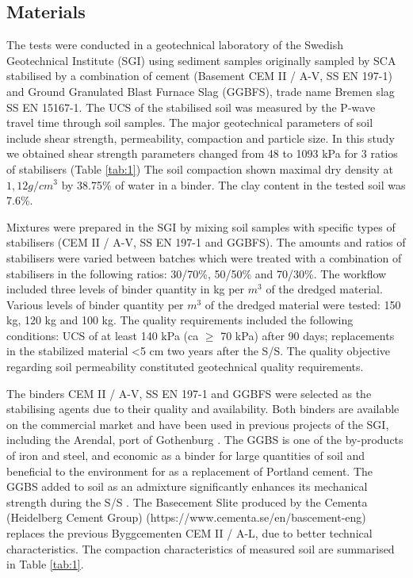 \documentclass[10pt,twoside,twocolumn,a4paper]{article}
\begin{document}
\subsection{Materials}
The tests were conducted in a geotechnical laboratory of the Swedish Geotechnical Institute (SGI) using sediment samples originally sampled by SCA stabilised by a combination of cement (Basement CEM II / A-V, SS EN 197-1) and Ground Granulated Blast Furnace Slag (GGBFS), trade name Bremen slag SS EN 15167-1. The UCS of the stabilised soil was measured by the P-wave travel time through soil samples. The major geotechnical parameters of soil include shear strength, permeability, compaction and particle size. In this study we obtained shear strength parameters changed from 48 to 1093 kPa for 3 ratios of stabilisers (Table \ref{tab:1}) The soil compaction shown maximal dry density at $1,12 g/cm^3$ by 38.75\% of water in a binder. The clay content in the tested soil was 7.6\%.

Mixtures were prepared in the SGI by mixing soil samples with specific types of stabilisers (CEM II / A-V, SS EN 197-1 and GGBFS). The amounts and ratios of stabilisers were varied between batches which were treated with a combination of stabilisers in the following ratios: 30/70\%, 50/50\% and 70/30\%. The workflow included three levels of binder quantity in kg per $m^3$ of the dredged material. Various levels of binder quantity per $m^3$ of the dredged material were tested: 150 kg, 120 kg and 100 kg. The quality requirements included the following conditions: UCS of at least 140 kPa (ca $\geq$ 70 kPa) after 90 days; replacements in the stabilized material \textless 5 cm two years after the S/S. The quality objective regarding soil permeability constituted geotechnical quality requirements. 

The binders CEM II / A-V, SS EN 197-1 and GGBFS were selected as the stabilising agents due to their quality and availability. Both binders are available on the commercial market and have been used in previous projects of the SGI, including the Arendal, port of Gothenburg \cite{Lindh2021a}. The GGBS is one of the by-products of iron and steel, and economic as a binder for large quantities of soil \cite{Yuksel} and beneficial to the environment for as a replacement of Portland cement. The GGBS added to soil as an admixture significantly enhances its mechanical strength during the S/S \cite{Wangetal2020}. The Basecement Slite produced by the Cementa (Heidelberg Cement Group) (https://www.cementa.se/en/bascement-eng) replaces the previous Byggcementen CEM II / A-L, due to better technical characteristics. The compaction characteristics of measured soil are summarised in Table \ref{tab:1}.  
\end{document}
